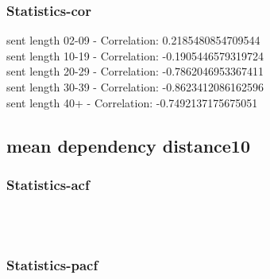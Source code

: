 \documentclass{article}%
\begin{document}
%
\newpage%
\subsubsection{Statistics{-}cor}%
\label{ssubsec:Statistics{-}cor}%
\noindent%
sent length 02-09 - Correlation: 0.2185480854709544\\%
sent length 10-19 - Correlation: -0.1905446579319724\\%
sent length 20-29 - Correlation: -0.7862046953367411\\%
sent length 30-39 - Correlation: -0.8623412086162596\\%
sent length 40+ - Correlation: -0.7492137175675051\\

%
\newpage

%
\subsection{mean dependency distance10}%
\label{subsec:meandependencydistance10}%
\subsubsection{Statistics{-}acf}%
\label{ssubsec:Statistics{-}acf}%


\begin{figure}[ht]%
\centering%
\setlength{\abovecaptionskip}{-35pt}%
%
%
\\%
%
%
\\%
%
\end{figure}

%
\newpage%
\subsubsection{Statistics{-}pacf}%
\label{ssubsec:Statistics{-}pacf}%
\end{document}

